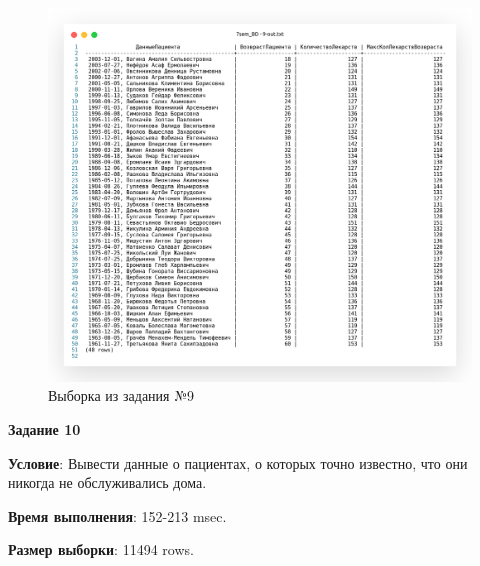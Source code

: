 \begin{figure}[!h]
  \centering

  \includegraphics[width=18cm]
  {../sql/task9/9-out.png}

  \caption{Выборка из задания №9}

  \label{fig:t9}
\end{figure}

\newpage


\begin{center}
  \textbf{Задание 10}
\end{center}
  
\textbf{Условие}:
Вывести данные о пациентах, о которых точно известно, что они никогда не обслуживались дома.







\textbf{Время выполнения}: 152-213 msec.

\textbf{Размер выборки}: 11494 rows.

